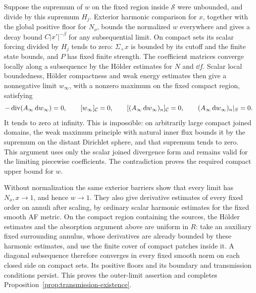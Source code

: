 Suppose the supremum of $w$ on the fixed region inside
$\mathcal S$ were unbounded, and divide by this supremum $H_j$.
Exterior harmonic comparison for $x$, together with the global
positive floor for $N_o$, bounds the normalized $w$ everywhere
and gives a decay bound $C|x'|^{-\beta}$ for any subsequential
limit.  On compact sets its scalar forcing divided by $H_j$
tends to zero: $\Sigma_+x$ is bounded by its cutoff and the
finite state bounds, and $P$ has fixed finite strength.  The
coefficient matrices converge locally along a subsequence by the
H\"older estimates for $N$ and $\dd f$.  Scalar local
boundedness, H\"older compactness and weak energy estimates
then give a nonnegative limit $w_\infty$, with a nonzero
maximum on the fixed compact region, satisfying
\begin{equation}
 -\operatorname{div}(A_\infty\mathop{}\!\mathrm d w_\infty)=0,
 \qquad [w_\infty]_{\mathcal C}=0,
 \qquad [(A_\infty\mathop{}\!\mathrm d w_\infty)_n]_{\mathcal C}=0,
 \qquad (A_\infty\mathop{}\!\mathrm d w_\infty)_n|_S=0.
 \label{eq:transmission-normalized-w-limit}
\end{equation}
It tends to zero at infinity.  This is impossible: on arbitrarily
large compact joined domains, the weak maximum principle with
natural inner flux bounds it by the supremum on the distant
Dirichlet sphere, and that supremum tends to zero.  This argument
uses only the scalar joined divergence form and remains valid for
the limiting piecewise coefficients.  The contradiction proves
the required compact upper bound for $w$.

Without normalization the same exterior barriers show that every
limit has $N_o,x\to1$, and hence $w\to1$.  They also give
derivative estimates of every fixed order on annuli after scaling,
by ordinary scalar harmonic estimates for the fixed smooth AF
metric.  On the compact region containing the sources, the
H\"older estimates and the absorption argument above are uniform
in $R$: take an auxiliary fixed surrounding annulus, whose
derivatives are already bounded by these harmonic estimates, and
use the finite cover of compact patches inside it.  A diagonal
subsequence therefore converges in every fixed smooth norm on
each closed side on compact sets.  Its positive floors and its
boundary and transmission conditions persist.  This proves the
outer-limit assertion and completes
Proposition~\ref{prop:transmission-existence}.
